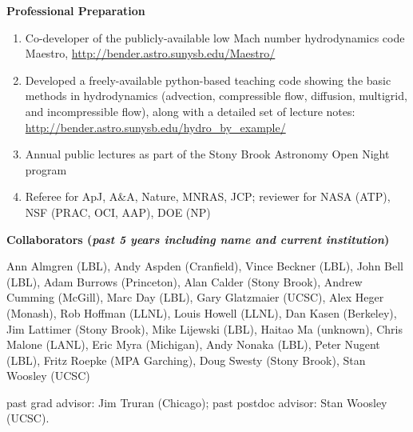 \documentclass[11pt,letterpaper,english]{article}
\begin{document}
\begin{flushleft} {\bf Professional Preparation}
\begin{enumerate}
\item Co-developer of the publicly-available low Mach number
  hydrodynamics code Maestro,
  \url{http://bender.astro.sunysb.edu/Maestro/} \\

\item Developed a freely-available python-based teaching code showing
  the basic methods in hydrodynamics (advection, compressible flow, 
  diffusion, multigrid, and incompressible flow), along with a detailed
  set of lecture notes: \url{http://bender.astro.sunysb.edu/hydro_by_example/} \\ 
\item Annual public lectures as part of the Stony Brook Astronomy Open Night program
 \\
 
\item Referee for ApJ, A\&A, Nature, MNRAS, JCP; reviewer for NASA (ATP), NSF (PRAC, OCI, AAP), DOE (NP) \\ 
\end{enumerate} 

\vspace{-6pt}
{\bf Collaborators ({\emph{past 5 years including name and current institution}})} 
{\parindent 16pt

Ann Almgren (LBL),
Andy Aspden (Cranfield),
Vince Beckner (LBL),
John Bell (LBL),
Adam Burrows (Princeton),
Alan Calder (Stony Brook),
Andrew Cumming (McGill),
Marc Day (LBL),
Gary Glatzmaier (UCSC),
Alex Heger (Monash),
Rob Hoffman (LLNL),
Louis Howell (LLNL),
Dan Kasen (Berkeley),
Jim Lattimer (Stony Brook),
Mike Lijewski (LBL),
Haitao Ma (unknown),
Chris Malone (LANL),
Eric Myra (Michigan),
Andy Nonaka (LBL),
Peter Nugent (LBL),
Fritz Roepke (MPA Garching),
Doug Swesty (Stony Brook),
Stan Woosley (UCSC)

past grad advisor: Jim Truran (Chicago); past postdoc advisor: Stan Woosley (UCSC).

}


\end{flushleft}
\end{document}
